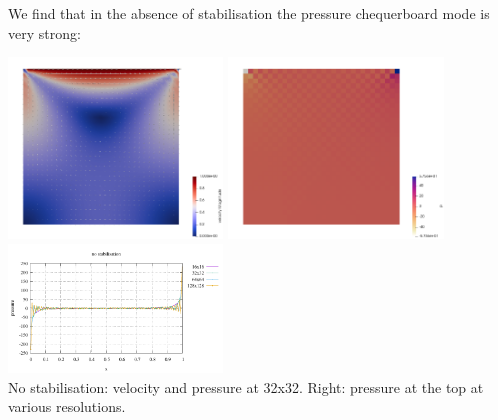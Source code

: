 We find that in the absence of stabilisation the pressure chequerboard mode is 
very strong:
\begin{center}
\includegraphics[width=5.7cm]{python_codes/fieldstone_115/results/ldc/nostab/vel}
\includegraphics[width=5.7cm]{python_codes/fieldstone_115/results/ldc/nostab/p}
\includegraphics[width=5.7cm]{python_codes/fieldstone_115/results/ldc/psurf_nostab.pdf}\\
{\captionfont No stabilisation: velocity and pressure at 32x32. Right: 
pressure at the top at various resolutions.}
\end{center}

